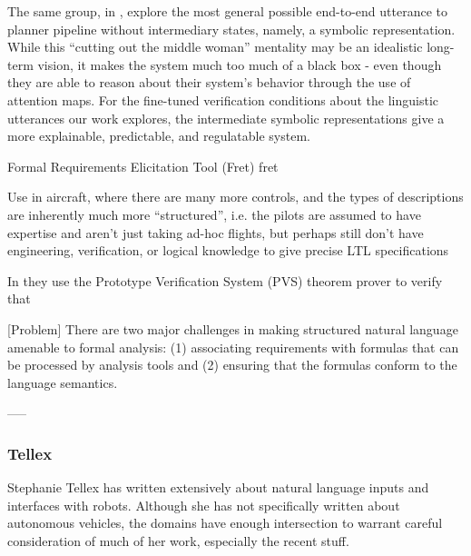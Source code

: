 \documentclass[a4paper, 11pt]{article}
\begin{document}
The same group, in \cite{kuo2020deep}, explore the most general possible
end-to-end utterance to planner pipeline without intermediary states, namely, a
symbolic representation. While this ``cutting out the middle woman'' mentality
may be an idealistic long-term vision, it makes the system much too much of a
black box - even though they are able to reason about their system's behavior
through the use of attention maps. For the fine-tuned verification conditions
about the linguistic utterances our work explores, the intermediate symbolic
representations give a more explainable, predictable, and regulatable system.


Formal Requirements Elicitation Tool (Fret) {fret}

Use in aircraft, where there are many more controls, and the types of
descriptions are inherently much more ``structured'', i.e. the pilots are
assumed to have expertise and aren't just taking ad-hoc flights, but perhaps
still don't have engineering, verification, or logical knowledge to give precise
LTL specifications

In \cite{fret} they use the Prototype Verification System (PVS) theorem prover
to verify that 

[Problem] There are two major challenges in making structured natural language
amenable to formal analysis: (1) associating requirements with formulas that can
be processed by analysis tools and (2) ensuring that the formulas conform to the
language semantics. \cite{fretish}

----- 





\subsubsection{Tellex}

Stephanie Tellex has written extensively about natural language inputs and
interfaces with robots. Although she has not specifically written about
autonomous vehicles, the domains have enough intersection to warrant careful
consideration of much of her work, especially the recent stuff.
\end{document}
